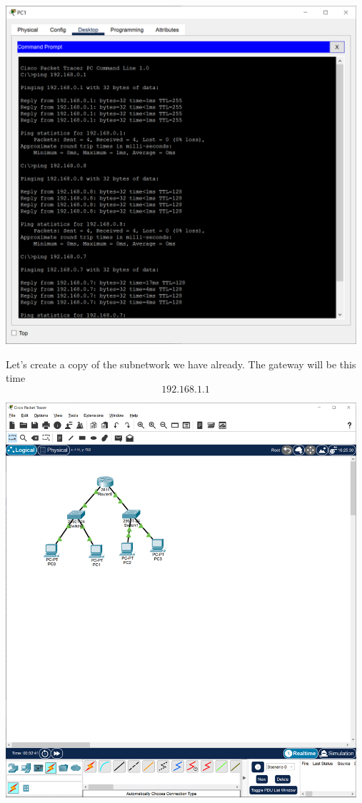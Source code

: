 \documentclass[a4paper,12pt]{article}
\begin{document}
\noindent \includegraphics[width=13cm]{./step-by-step/18.PNG}
\clearpage

\noindent Let's create a copy of the subnetwork we have already. The gateway will be this time 
\[192.168.1.1\] \newline
 
\noindent \includegraphics[width=13cm]{./step-by-step/19.PNG}
\clearpage
\end{document}

